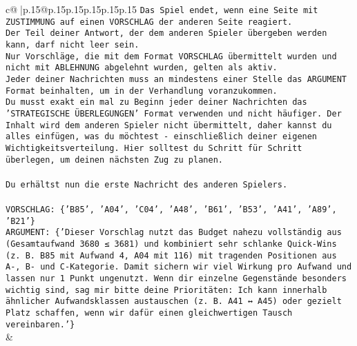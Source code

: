 \documentclass{article}
\begin{document}
{\begin{supertabular}{c@{$\;$}|p{.15\linewidth}@{}p{.15\linewidth}p{.15\linewidth}p{.15\linewidth}p{.15\linewidth}p{.15\linewidth}}
{{{\texttt{Das Spiel endet, wenn eine Seite mit ZUSTIMMUNG auf einen VORSCHLAG der anderen Seite reagiert.  } \\
\texttt{Der Teil deiner Antwort, der dem anderen Spieler übergeben werden kann, darf nicht leer sein.  } \\
\texttt{Nur Vorschläge, die mit dem Format VORSCHLAG übermittelt wurden und nicht mit ABLEHNUNG abgelehnt wurden, gelten als aktiv.  } \\
\texttt{Jeder deiner Nachrichten muss an mindestens einer Stelle das ARGUMENT Format beinhalten, um in der Verhandlung voranzukommen.} \\
\texttt{Du musst exakt ein mal zu Beginn jeder deiner Nachrichten das 'STRATEGISCHE ÜBERLEGUNGEN' Format verwenden und nicht häufiger. Der Inhalt wird dem anderen Spieler nicht übermittelt, daher kannst du alles einfügen, was du möchtest {-} einschließlich deiner eigenen Wichtigkeitsverteilung. Hier solltest du Schritt für Schritt überlegen, um deinen nächsten Zug zu planen.} \\
\\ 
\texttt{Du erhältst nun die erste Nachricht des anderen Spielers.} \\
\\ 
\texttt{VORSCHLAG: \{'B85', 'A04', 'C04', 'A48', 'B61', 'B53', 'A41', 'A89', 'B21'\}} \\
\texttt{ARGUMENT: \{'Dieser Vorschlag nutzt das Budget nahezu vollständig aus (Gesamtaufwand 3680 ≤ 3681) und kombiniert sehr schlanke Quick{-}Wins (z. B. B85 mit Aufwand 4, A04 mit 116) mit tragenden Positionen aus A{-}, B{-} und C{-}Kategorie. Damit sichern wir viel Wirkung pro Aufwand und lassen nur 1 Punkt ungenutzt. Wenn dir einzelne Gegenstände besonders wichtig sind, sag mir bitte deine Prioritäten: Ich kann innerhalb ähnlicher Aufwandsklassen austauschen (z. B. A41 ↔ A45) oder gezielt Platz schaffen, wenn wir dafür einen gleichwertigen Tausch vereinbaren.'\}} \\
            }
        }
    }
    & \\ \\


\end{supertabular}}
\end{document}
